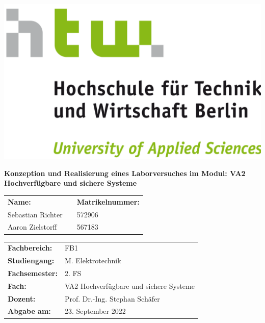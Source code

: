 \documentclass[
	pagesize,
	fontsize=12pt,
	paper=a4,
	oneside,
   reqno
]{scrartcl}
\numberwithin{table}{section}
\numberwithin{figure}{section}
\begin{document}
\begin{titlepage}
   \pagestyle{empty} %

   \begin{flushright}
   \includegraphics[scale=.07]{Bilder/LogoHTWBerlin.png}  \nocite{HTWgross}
   \end{flushright}

   \vspace{1cm}

   \begin{center}
      \Huge{\textbf{Konzeption und Realisierung eines Laborversuches im Modul:
VA2 Hochverfügbare und sichere Systeme}} \\
   \end{center}

   \vspace{3cm}

   \begin{flushleft}
      \begin{tabular}{l c l }
         \textbf{Name: }&\hspace{1 cm} &\textbf{Matrikelnummer:} \\
         Sebastian Richter  & & 572906 \\
         Aaron Zielstorff   & & 567183 \\
      \end{tabular}
   \end{flushleft}

   \vspace{1cm}

   \begin{tabular}{l l}
      \textbf{Fachbereich:}   & FB1                                                 \\
      \textbf{Studiengang:}   & M.\xspace Elektrotechnik                            \\
      \textbf{Fachsemester:}  & 2.\xspace FS                                        \\
      \textbf{Fach:}          & VA2 Hochverfügbare und sichere Systeme              \\
      \textbf{Dozent:}        & Prof.\xspace Dr.\xspace -Ing.\xspace Stephan Schäfer\\
      \textbf{Abgabe am:}     & 23.\xspace September 2022                           \\ 
   \end{tabular}
\end{titlepage}
\end{document}
